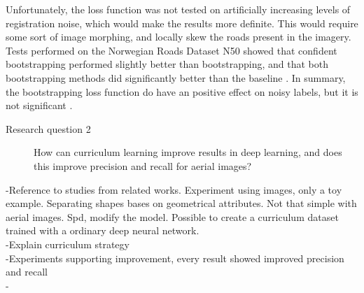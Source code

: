 Unfortunately, the loss function was not tested on artificially increasing levels of registration noise, which would make the results more definite. This would require some sort of image morphing, and locally skew the roads present in the imagery. \\

Tests performed on the Norwegian Roads Dataset N50 showed that confident bootstrapping performed slightly better than bootstrapping, and that both bootstrapping methods did significantly better than the baseline . In summary, the bootstrapping loss function do have an positive effect on noisy labels, but it is not significant . 


\begin{description}
\item[Research question 2]  How can curriculum learning improve results in deep learning, and does this improve precision and recall for aerial images?
\end{description}

-Reference to studies from related works. Experiment using images, only a toy example. Separating shapes bases on geometrical attributes. Not that simple with aerial images. Spd, modify the model. Possible to create a curriculum dataset trained with a ordinary deep neural network.\\
-Explain curriculum strategy\\
-Experiments supporting improvement, every result showed improved precision and recall\\
-

